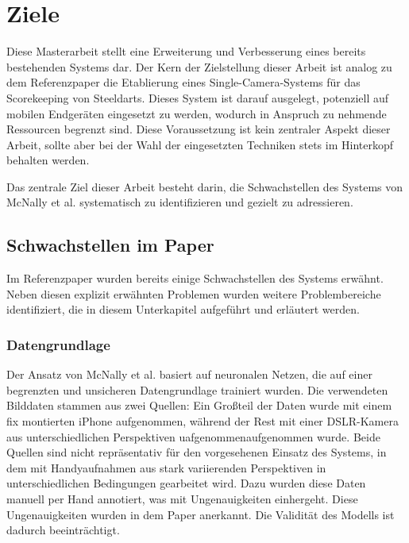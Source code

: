 \section{Ziele}
\label{sec:ziele}

Diese Masterarbeit stellt eine Erweiterung und Verbesserung eines bereits bestehenden Systems dar. Der Kern der Zielstellung dieser Arbeit ist analog zu dem Referenzpaper die Etablierung eines Single-Camera-Systems für das Scorekeeping von Steeldarts. Dieses System ist darauf ausgelegt, potenziell auf mobilen Endgeräten eingesetzt zu werden, wodurch in Anspruch zu nehmende Ressourcen begrenzt sind. Diese Voraussetzung ist kein zentraler Aspekt dieser Arbeit, sollte aber bei der Wahl der eingesetzten Techniken stets im Hinterkopf behalten werden.

Das zentrale Ziel dieser Arbeit besteht darin, die Schwachstellen des Systems von McNally et al. systematisch zu identifizieren und gezielt zu adressieren.

\subsection{Schwachstellen im Paper}
\label{sub:schwachstellen}

Im Referenzpaper wurden bereits einige Schwachstellen des Systems erwähnt. Neben diesen explizit erwähnten Problemen wurden weitere Problembereiche identifiziert, die in diesem Unterkapitel aufgeführt und erläutert werden.

\subsubsection{Datengrundlage}
\label{sec:ziele:schwachstellen:datengrundlage}

Der Ansatz von McNally et al. basiert auf neuronalen Netzen, die auf einer begrenzten und unsicheren Datengrundlage trainiert wurden. Die verwendeten Bilddaten stammen aus zwei Quellen: Ein Großteil der Daten wurde mit einem fix montierten iPhone aufgenommen, während der Rest mit einer DSLR-Kamera aus unterschiedlichen Perspektiven uafgenommenaufgenommen wurde. Beide Quellen sind nicht repräsentativ für den vorgesehenen Einsatz des Systems, in dem mit Handyaufnahmen aus stark variierenden Perspektiven in unterschiedlichen Bedingungen gearbeitet wird. Dazu wurden diese Daten manuell per Hand annotiert, was mit Ungenauigkeiten einhergeht. Diese Ungenauigkeiten wurden in dem Paper anerkannt. Die Validität des Modells ist dadurch beeinträchtigt.

